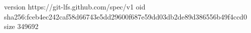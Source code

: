 version https://git-lfs.github.com/spec/v1
oid sha256:fceb4ec242caf58d66743e5dd29600f687e59dd03db2de89d386556b49f4ccd0
size 349692
